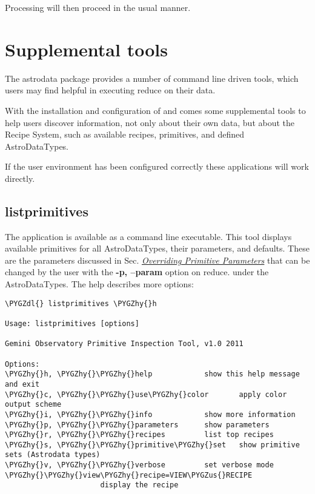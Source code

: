\documentclass[letterpaper,10pt,english]{sphinxmanual}
\def\PYGZus{\char`\_}
\def\PYGZdl{\char`\$}
\def\PYGZhy{\char`\-}
\begin{document}
Processing will then proceed in the usual manner.


\chapter{Supplemental tools}
\label{supptools:supplemental-tools}\label{supptools::doc}
The astrodata package provides a number of command line driven tools, which
users may find helpful in executing reduce on their data.

With the installation and configuration of  and  comes
some supplemental tools to help users discover information, not only about their
own data, but about the Recipe System, such as available recipes, primitives,
and defined AstroDataTypes.

If the user environment has been configured correctly these applications
will work directly.


\section{listprimitives}
\label{supptools:listprimitives}
The application  is available as a command line executable.
This tool displays available primitives for all AstroDataTypes, their parameters,
and defaults. These are the parameters discussed in Sec. {\hyperref[interfaces:userpars]{\emph{Overriding Primitive Parameters}}} that
can be changed by the user with the \textbf{-p, --param} option on reduce. under the
AstroDataTypes. The help describes more options:

\begin{Verbatim}[commandchars=\\\{\}]
\PYGZdl{} listprimitives \PYGZhy{}h

Usage: listprimitives [options]

Gemini Observatory Primitive Inspection Tool, v1.0 2011

Options:
\PYGZhy{}h, \PYGZhy{}\PYGZhy{}help            show this help message and exit
\PYGZhy{}c, \PYGZhy{}\PYGZhy{}use\PYGZhy{}color       apply color output scheme
\PYGZhy{}i, \PYGZhy{}\PYGZhy{}info            show more information
\PYGZhy{}p, \PYGZhy{}\PYGZhy{}parameters      show parameters
\PYGZhy{}r, \PYGZhy{}\PYGZhy{}recipes         list top recipes
\PYGZhy{}s, \PYGZhy{}\PYGZhy{}primitive\PYGZhy{}set   show primitive sets (Astrodata types)
\PYGZhy{}v, \PYGZhy{}\PYGZhy{}verbose         set verbose mode
\PYGZhy{}\PYGZhy{}view\PYGZhy{}recipe=VIEW\PYGZus{}RECIPE
                      display the recipe
\end{Verbatim}
\end{document}
